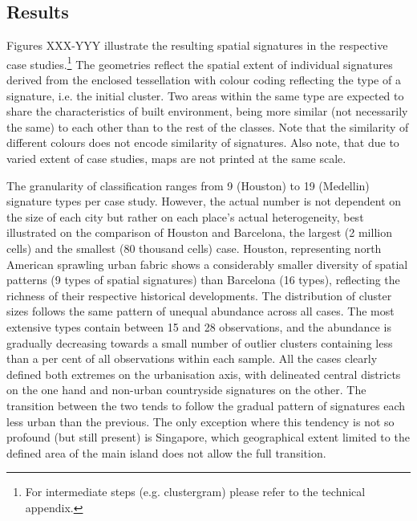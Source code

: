 \subsection{Results}

Figures XXX-YYY illustrate the resulting spatial signatures in the respective case
studies.\footnote{For intermediate steps (e.g. clustergram) please refer to the
technical appendix.} The geometries reflect the spatial extent of individual signatures
derived from the enclosed tessellation
with colour coding reflecting the type of a signature, i.e. the initial cluster. Two
areas within the same type are expected to share the characteristics of built
environment, being more similar (not necessarily the same) to each other than to the
rest of the classes. Note that the similarity of different colours does not encode
similarity of signatures. Also note, that due to varied extent of case studies, maps are
not printed at the same scale.

The granularity of classification ranges from 9 (Houston) to 19 (Medellin) signature
types per case study. However, the actual number is not dependent on the size of each
city but rather on each place's actual heterogeneity, best illustrated on the comparison
of Houston and Barcelona, the largest (2 million cells) and the smallest (80 thousand
cells) case. Houston, representing north American sprawling urban fabric shows a
considerably smaller diversity of spatial patterns (9 types of spatial signatures) than
Barcelona (16 types), reflecting the richness of their respective historical
developments.
The distribution of cluster sizes follows the same pattern of unequal abundance across
all cases. The most extensive types contain between 15 and 28%
observations, and the abundance is gradually decreasing towards a small number of
outlier clusters containing less than a per cent of all observations within each sample.
All the cases clearly defined both extremes on the urbanisation axis, with delineated
central districts on the one hand and non-urban countryside signatures on the other. The
transition between the two tends to follow the gradual pattern of signatures each less
urban than the previous. The only exception where this tendency is not so profound (but
still present) is Singapore, which geographical extent limited to the defined area of
the main island does not allow the full transition.


